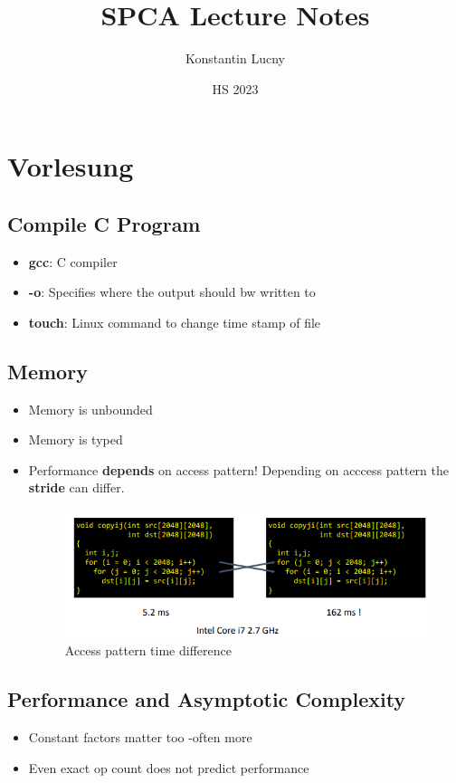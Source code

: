 \documentclass[a4paper,10pt]{article}
\title{SPCA Lecture Notes}
\author{Konstantin Lucny}
\date{HS 2023}
\begin{document}
\maketitle
\section{Vorlesung}
\subsection{Compile C Program}
\begin{itemize}
    \item \textbf{gcc}: C compiler
    \item \textbf{-o}: Specifies where the output should bw written to
    \item \textbf{touch}: Linux command to change time stamp of file
\end{itemize}
\subsection{Memory}
\begin{itemize}
    \item Memory is unbounded
    \item Memory is typed
    \item Performance \textbf{depends} on access pattern! Depending on acccess pattern the \textbf{stride} can differ. 
    \begin{figure}[htp]
    \centering
    \includegraphics[width=13cm]{Pictures/e1.png}
    \caption{Access pattern time difference}
    \label{fig:example}
\end{figure}
\end{itemize}
\subsection{Performance and Asymptotic Complexity}

\begin{itemize}
    \item Constant factors matter too -often more
    \item Even exact op count does not predict performance
\end{itemize}
\end{document}
